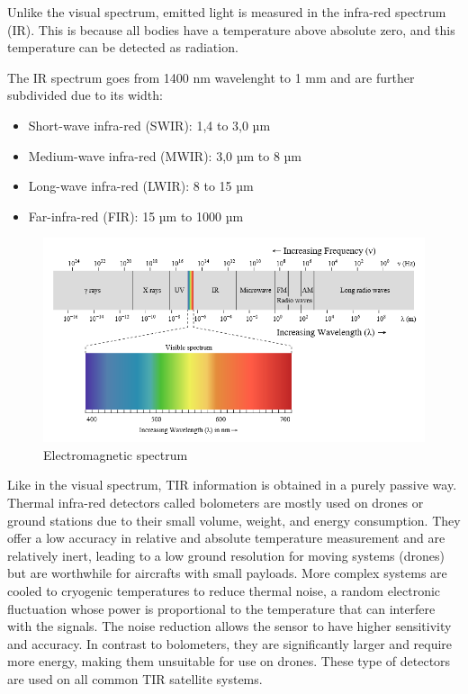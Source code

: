     Unlike the visual spectrum, emitted light is measured in the infra-red spectrum (IR).
    This is because all bodies have a temperature above absolute zero, and this temperature can be detected as radiation.


    The IR spectrum goes from 1400 nm wavelenght to 1 mm and are further subdivided due to its width:


    \begin{itemize}
        \item  Short-wave infra-red (SWIR): 1,4 to 3,0 µm
        \item  Medium-wave infra-red (MWIR): 3,0 µm to 8 µm
        \item Long-wave infra-red (LWIR): 8 to 15 µm
        \item Far-infra-red (FIR): 15 µm to 1000 µm
    \end{itemize}

    \begin{figure}[H]
        \centering
        \includegraphics[width=\textwidth]{Includes/1-electromagnetic-spectrum.png}
        \caption{Electromagnetic spectrum}
        \label{fig:1-electromagnetic-spectrum}
    \end{figure}


    
    Like in the visual spectrum, TIR information is obtained in a purely passive way.
    Thermal infra-red detectors called bolometers are mostly used on drones or ground stations due to their small volume, weight, and energy consumption. 
    They offer a low accuracy in relative and absolute temperature measurement and are relatively inert, leading to a low ground resolution for moving systems (drones) but are worthwhile for aircrafts with small payloads.     
    More complex systems are cooled to cryogenic temperatures to reduce thermal noise, a random electronic fluctuation whose power is proportional to the temperature that can interfere with the signals. The noise reduction allows the sensor to have higher sensitivity and accuracy.
    In contrast to bolometers, they are significantly larger and require more energy, making them unsuitable for use on drones.
    These type of detectors are used on all common TIR satellite systems.

